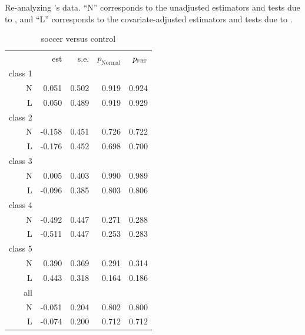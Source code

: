 \begin{table}
\centering
\caption{Re-analyzing \citet{chong2016iron}'s data. ``\textsc{N}'' corresponds to the unadjusted estimators and tests due to \citet{Neyman:1923}, and ``\textsc{L}'' corresponds to the covariate-adjusted estimators and tests due to \citet{lin2013}.}\label{tb::pv-values-chong}
\begin{subtable}[h]{0.45\textwidth}
\caption{soccer versus control}
    \begin{tabular}{rrrrr}
    \hline 
   &    est & s.e. &$p_\text{Normal}$ & $p_{\textsc{frt}}$ \\
       class 1& &&&\\
\textsc{N}  &  0.051 &0.502 &     0.919  & 0.924 \\
\textsc{L}   &    0.050 & 0.489 &     0.919 &  0.929 \\
       class 2& &&&\\
\textsc{N}  &  -0.158 &0.451  &    0.726  & 0.722\\
\textsc{L}   &  -0.176 & 0.452   &   0.698  & 0.700 \\
       class 3& &&&\\
\textsc{N}  &  0.005 &0.403  &    0.990 &  0.989 \\
\textsc{L}   &   -0.096& 0.385 &     0.803&   0.806 \\
       class 4& &&&\\
\textsc{N}  &  -0.492& 0.447  &    0.271 &  0.288 \\
\textsc{L}   &    -0.511& 0.447  &    0.253 &  0.283 \\
       class 5& &&&\\
\textsc{N}  &  0.390& 0.369 &     0.291 &  0.314 \\
\textsc{L}   &   0.443 &0.318  &    0.164  & 0.186 \\
       all& &&&\\
\textsc{N}  &  -0.051 & 0.204  &    0.802 &  0.800 \\
\textsc{L}   &    -0.074& 0.200   &   0.712  & 0.712\\
\hline 
    \end{tabular}
\end{subtable}


\end{table}
